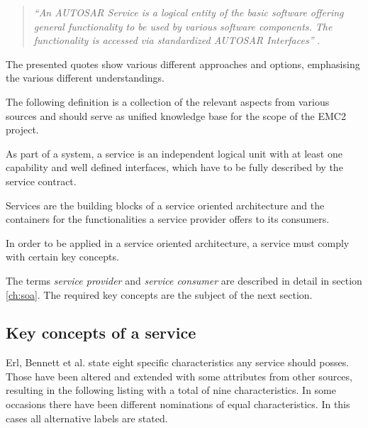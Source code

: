 \begin{description}
\begin{quote}
\emph{``An AUTOSAR Service is a logical entity of the basic software offering general functionality to be used by various software components. The functionality is accessed via standardized AUTOSAR Interfaces''} \cite{autosar_glossary}.
\end{quote}

\end{description}

The presented quotes show various different approaches and options, emphasising the various different understandings.

The following definition is a collection of the relevant aspects from various sources and should serve as unified knowledge base for the scope of the EMC2 project.

\begin{myquote}
	As part of a system, a service is an independent logical unit with at least one capability and well defined interfaces, which have to be fully described by the service contract.

	Services are the building blocks of a service oriented architecture and the containers for the functionalities a service provider offers to its consumers.

	In order to be applied in a service oriented architecture, a service must comply with certain key concepts.
\end{myquote}

The terms \emph{service provider} and \emph{service consumer} are described in detail in section \ref{ch:soa}. The required key concepts are the subject of the next section.

\subsection{Key concepts of a service}
\label{sec:service-concepts}
Erl, Bennett et al. \cite[p.27]{erl2011} state eight specific characteristics any service should posses. Those have been altered and extended with some attributes from other sources, resulting in the following listing with a total of nine characteristics. In some occasions there have been different nominations of equal characteristics. In this cases all alternative labels are stated.

